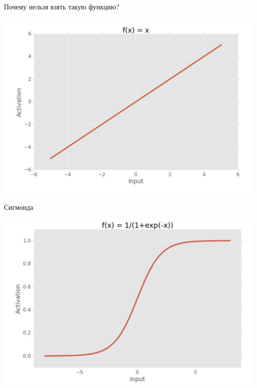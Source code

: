 \documentclass[notes,12pt, aspectratio=169]{beamer}
\begin{document}
\begin{frame}{Почему нельзя взять такую функцию?}
\begin{center}
	\includegraphics[width=0.7\paperwidth]{activation_1.png}
\end{center}
\end{frame}


\begin{frame}{Сигмоида}
\begin{center}
	\includegraphics[width=0.7\paperwidth]{activation_2.png}
\end{center}
\end{frame}
\end{document}

